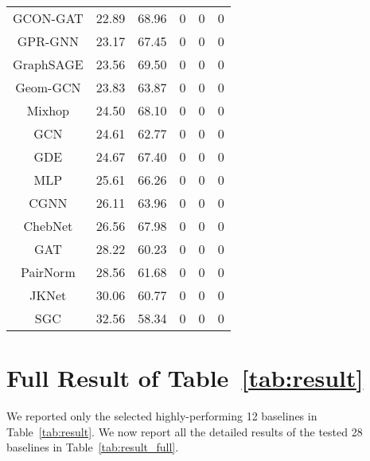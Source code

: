 \documentclass{article}
\theoremstyle{plain}
\theoremstyle{definition}
\theoremstyle{remark}
\begin{document}
\begin{table}[ht]
\begin{tabular}{c cc ccc}
        GCON-GAT & 22.89  & 68.96 & 0 & 0 & 0\\
        GPR-GNN	 & 23.17  & 67.45 & 0 & 0 & 0\\
        GraphSAGE& 23.56  & 69.50 & 0 & 0 & 0\\
        Geom-GCN & 23.83  & 63.87 & 0 & 0 & 0\\
        Mixhop	 & 24.50  & 68.10 & 0 & 0 & 0\\
        GCN      & 24.61  & 62.77 & 0 & 0 & 0\\
        GDE      & 24.67  & 67.40 & 0 & 0 & 0\\
        MLP      & 25.61  & 66.26 & 0 & 0 & 0\\
        CGNN     & 26.11  & 63.96 & 0 & 0 & 0\\
        ChebNet  & 26.56  & 67.98 & 0 & 0 & 0\\
        GAT      & 28.22  & 60.23 & 0 & 0 & 0\\
        PairNorm & 28.56  & 61.68 & 0 & 0 & 0\\
        JKNet    & 30.06  & 60.77 & 0 & 0 & 0\\
        SGC      & 32.56  & 58.34 & 0 & 0 & 0\\
        \bottomrule
    \end{tabular}
    \label{tab:summary_full}
\end{table}

\clearpage

\section{Full Result of Table~\ref{tab:result}}\label{a:full}
We reported only the selected highly-performing 12 baselines in Table~\ref{tab:result}. We now report all the detailed results of the tested 28 baselines in Table~\ref{tab:result_full}.
\end{document}
